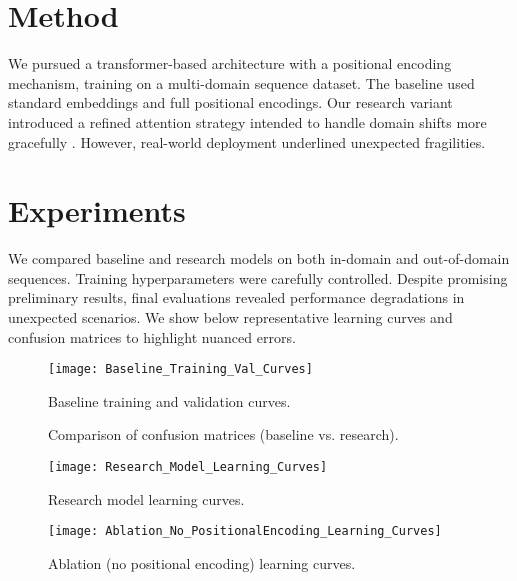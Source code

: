 \documentclass[11pt]{article}
\begin{document}
\section{Method}
We pursued a transformer-based architecture with a positional encoding mechanism, training on a multi-domain sequence dataset. The baseline used standard embeddings and full positional encodings. Our research variant introduced a refined attention strategy intended to handle domain shifts more gracefully \citep{li2021pitfalls}. However, real-world deployment underlined unexpected fragilities.

\section{Experiments}
We compared baseline and research models on both in-domain and out-of-domain sequences. Training hyperparameters were carefully controlled. Despite promising preliminary results, final evaluations revealed performance degradations in unexpected scenarios. We show below representative learning curves and confusion matrices to highlight nuanced errors.

\begin{figure}[!ht]
    \centering
    \texttt{[image: Baseline\_Training\_Val\_Curves]}
    \caption{Baseline training and validation curves.}
    \label{fig:baseline_curves}
\end{figure}

\begin{figure}[!ht]
  \centering
  \caption{Comparison of confusion matrices (baseline vs. research).}
  \label{fig:conf_matrix_combined}
\end{figure}

\begin{figure}[!ht]
    \centering
    \texttt{[image: Research\_Model\_Learning\_Curves]}
    \caption{Research model learning curves.}
    \label{fig:research_curves}
\end{figure}

\begin{figure}[!ht]
    \centering
    \texttt{[image: Ablation\_No\_PositionalEncoding\_Learning\_Curves]}
    \caption{Ablation (no positional encoding) learning curves.}
    \label{fig:ablation_curves}
\end{figure}
\end{document}
